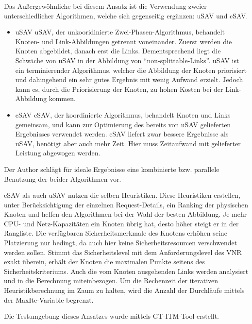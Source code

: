 \documentclass{lni}
\begin{document}
Das Außergewöhnliche bei diesem Ansatz ist die Verwendung zweier unterschiedlicher Algorithmen, welche sich gegenseitig ergänzen: uSAV und cSAV.
\begin{itemize}
	\item uSAV \newline
	uSAV, der unkooridinierte Zwei-Phasen-Algorithmus, behandelt Knoten- und Link-Abbildungen getrennt voneinander. Zuerst werden die Knoten abgebildet, danach erst die Links. Dementsprechend liegt die Schwäche von uSAV in der Abbildung von "`non-splittable-Links"'. uSAV ist ein terminierender Algorithmus, welcher die Abbildung der Knoten priorisiert und dahingehend ein sehr gutes Ergebnis mit wenig Aufwand erzielt. Jedoch kann es, durch die Priorisierung der Knoten, zu hohen Kosten bei der Link-Abbildung kommen.

	\item cSAV \newline
	cSAV, der koordinierte Algorithmus, behandelt Knoten und Links gemeinsam, und kann zur Optimierung des bereits von uSAV gelieferten Ergebnisses verwendet werden. cSAV liefert zwar bessere Ergebnisse als uSAV, benötigt aber auch mehr Zeit. Hier muss Zeitaufwand mit gelieferter Leistung abgewogen werden.

\end{itemize} 

Der Author schlägt für ideale Ergebnisse eine kombinierte bzw. parallele Benutzung der beider Algorithmen vor. 

cSAV als auch uSAV nutzen die selben Heuristiken. Diese Heuristiken erstellen, unter Berücksichtigung der einzelnen Request-Details, ein Ranking der physischen Knoten und helfen den Algorithmen bei der Wahl der besten Abbildung. Je mehr CPU- und Netz-Kapazitäten ein Knoten übrig hat, desto höher steigt er in der Rangliste. Die verfügbaren Sicherheitsmerkmale des Knotens erhöhen seine Platzierung nur bedingt, da auch hier keine Sicherheitsresourcen verschwendet werden sollen. Stimmt das Sicherheitslevel mit dem Anforderungslevel des VNR exakt überein, erhält der Knoten die maximalen Punkte seitens des Sicherheitskriteriums. Auch die vom Knoten ausgehenden Links werden analysiert und in die Berechnung miteinbezogen. Um die Rechenzeit der iterativen Heuristikberechnung im Zaum zu halten, wird die Anzahl der Durchläufe mittels der MaxIte-Variable begrenzt. 



Die Testumgebung dieses Ansatzes wurde mittels GT-ITM-Tool erstellt. \cite{GT-ITM-Tool} 
\end{document}
